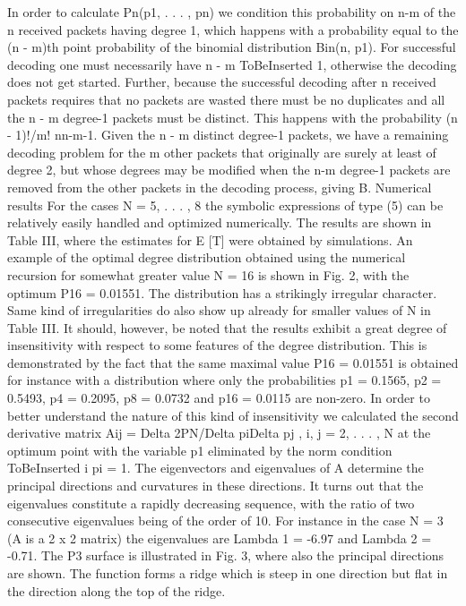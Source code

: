 \documentclass[12pt,a4paper,titlepage,twocolumn]{article}
\begin{document}
\begin{itemize}
In order to calculate Pn(p1, . . . , pn) we condition this
probability on n-m of the n received packets having degree
1, which happens with a probability equal to the (n - m)th
point probability of the binomial distribution Bin(n, p1). For
successful decoding one must necessarily have n - m ToBeInserted 1,
otherwise the decoding does not get started. Further, because
the successful decoding after n received packets requires that
no packets are wasted there must be no duplicates and all the
n - m degree-1 packets must be distinct. This happens with
the probability (n - 1)!/m! nn-m-1.
Given the n - m distinct degree-1 packets, we have a
remaining decoding problem for the m other packets that
originally are surely at least of degree 2, but whose degrees
may be modified when the n-m degree-1 packets are removed
from the other packets in the decoding process, giving
B. Numerical results
For the cases N = 5, . . . , 8 the symbolic expressions of type
(5) can be relatively easily handled and optimized numerically.
The results are shown in Table III, where the estimates for
E [T] were obtained by simulations. An example of the optimal
degree distribution obtained using the numerical recursion for
somewhat greater value N = 16 is shown in Fig. 2, with
the optimum P16 = 0.01551. The distribution has a strikingly
irregular character. Same kind of irregularities do also show up
already for smaller values of N in Table III. It should, however,
be noted that the results exhibit a great degree of insensitivity
with respect to some features of the degree distribution. This is
demonstrated by the fact that the same maximal value P16 =
0.01551 is obtained for instance with a distribution where only
the probabilities p1 = 0.1565, p2 = 0.5493, p4 = 0.2095,
p8 = 0.0732 and p16 = 0.0115 are non-zero.
In order to better understand the nature of this kind of
insensitivity we calculated the second derivative matrix Aij = Delta 2PN/Delta piDelta pj , i, j = 2, . . . , N at the optimum point with
the variable p1 eliminated by the norm condition
ToBeInserted
i pi = 1.
The eigenvectors and eigenvalues of A determine the principal
directions and curvatures in these directions. It turns out that
the eigenvalues constitute a rapidly decreasing sequence, with
the ratio of two consecutive eigenvalues being of the order of
10. For instance in the case N = 3 (A is a 2 x 2 matrix) the
eigenvalues are Lambda 1 = -6.97 and Lambda 2 = -0.71. The P3 surface
is illustrated in Fig. 3, where also the principal directions
are shown. The function forms a ridge which is steep in one
direction but flat in the direction along the top of the ridge.

\end{itemize}
\end{document}
